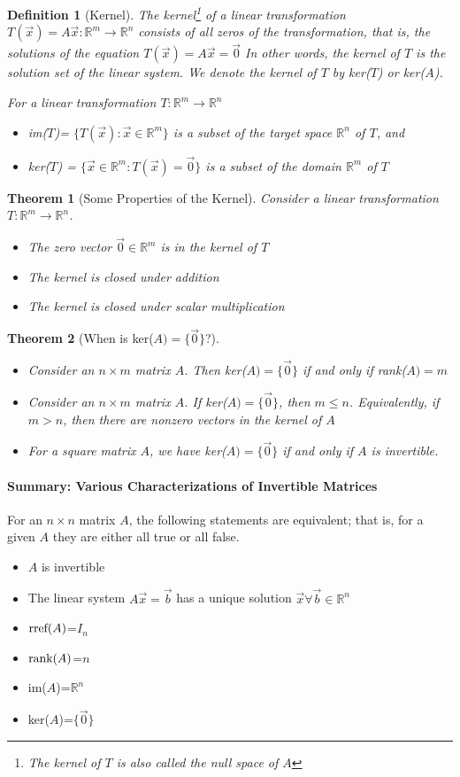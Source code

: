 \documentclass[10pt]{report}
\newtheorem{thm2}{Theorem}[section]
\newtheorem{def2}{Definition}[section]
\newcommand{\rref}{\textup{rref}}
\newcommand{\rank}{\textup{rank}}
\begin{document}
\begin{def2}[Kernel]
The kernel\footnote{The kernel of $T$ is also called the null space of $A$} of a linear transformation $T(\vec{x})=A\vec{x}:\mathbb{R}^m \to \mathbb{R}^n$ consists of all zeros of the transformation, that is, the solutions of the equation $T(\vec{x})=A\vec{x}=\vec{0}$
In other words, the kernel of $T$ is the solution set of the linear system. We denote the kernel of $T$ by ker($T$) or ker($A$).

For a linear transformation $T:\mathbb{R}^m \to \mathbb{R}^n$
\begin{itemize}
\item im($T$)= $\{T(\vec{x}):\vec{x}\in \mathbb{R}^m\}$ is a subset of the target space $\mathbb{R}^n$ of $T$, and
\item ker($T$) = $\{\vec{x}\in \mathbb{R}^m:T(\vec{x})=\vec{0}\}$ is a subset of the domain $\mathbb{R}^m$ of $T$
\end{itemize}
\end{def2}
\begin{thm2}[Some Properties of the Kernel]
Consider a linear transformation $T:\mathbb{R}^m \to \mathbb{R}^n$.
\begin{itemize}
\item[a.] The zero vector $\vec{0}\in \mathbb{R}^m$ is in the kernel of $T$
\item[b.] The kernel is closed under addition
\item[c.] The kernel is closed under scalar multiplication
\end{itemize}
\end{thm2}
\begin{thm2}[When is ker($A)=\{\vec{0}\}$?]
\begin{itemize}
\item[a.] Consider an $n\times m$ matrix $A$. Then ker($A)=\{\vec{0}\}$ if and only if rank($A)=m$
\item[b.] Consider an $n\times m$ matrix $A$. If ker($A)=\{\vec{0}\}$, then $m\leq n$. Equivalently, if $m>n$, then there are nonzero vectors in the kernel of $A$
\item[c.] For a square matrix $A$, we have ker($A)=\{\vec{0}\}$ if and only if $A$ is invertible.
\end{itemize}
\end{thm2}
\paragraph{Summary: Various Characterizations of Invertible Matrices}
For an $n\times n$ matrix $A$, the following statements are equivalent; that is, for a given $A$ they are either all true or all false.
\begin{itemize}
\item[i.] $A$ is invertible
\item[ii.] The linear system $A\vec{x}=\vec{b}$ has a unique solution $\vec{x}\forall\vec{b}\in \mathbb{R}^n$
\item[iii.] $\rref(A)$=$I_n$
\item[iv.] $\rank(A)$=$n$
\item[v.] im($A$)=$\mathbb{R}^n$
\item[vi.] ker($A$)=$\{\vec{0}\}$
\end{itemize}
\end{document}
